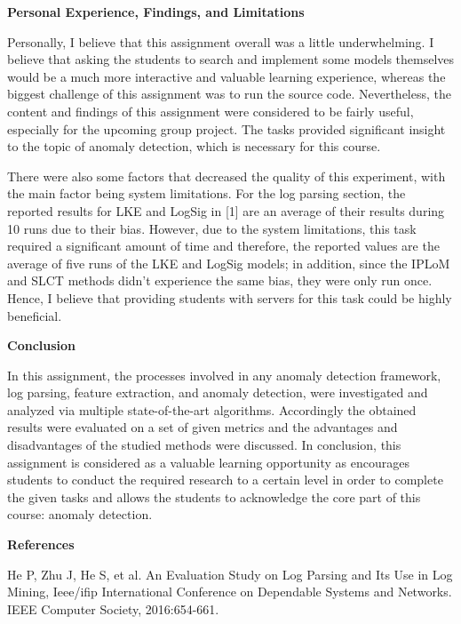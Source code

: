 \documentclass[12pt,a4paper]{article}
\begin{document}
	\vspace{0.4cm}
	\noindent \textbf{\Large Personal Experience, Findings, and Limitations}
	\vspace{0.3cm}
	
	\noindent Personally, I believe that this assignment overall was a little underwhelming. I believe that asking the students to search and implement some models themselves would be a much more interactive and valuable learning experience, whereas the biggest challenge of this assignment was to run the source code. Nevertheless, the content and findings of this assignment were considered to be fairly useful, especially for the upcoming group project. The tasks provided significant insight to the topic of anomaly detection, which is necessary for this course. 
	
	\noindent There were also some factors that decreased the quality of this experiment, with the main factor being system limitations. For the log parsing section, the reported results for LKE and LogSig in [1] are an average of their results during 10 runs due to their bias. However, due to the system limitations, this task required a significant amount of time and therefore, the reported values are the average of five runs of the LKE and LogSig models; in addition, since the IPLoM and SLCT methods didn't experience the same bias, they were only run once. Hence, I believe that providing students with servers for this task could be highly beneficial.
	
	\vspace{0.4cm}
	\noindent \textbf{\Large Conclusion}
	\vspace{0.3cm}
	
	\noindent In this assignment, the processes involved in any anomaly detection framework, log parsing, feature extraction, and anomaly detection, were investigated and analyzed via multiple state-of-the-art algorithms. Accordingly the obtained results were evaluated on a set of given metrics and the advantages and disadvantages of the studied methods were discussed. In conclusion, this assignment is considered as a valuable learning opportunity as encourages students to conduct the required research to a certain level in order to complete the given tasks and allows the students to acknowledge the core part of this course: anomaly detection. 
	
	\noindent \textbf{\Large References}
	\vspace{0.5cm}
	
	\noindent[1] He P, Zhu J, He S, et al. An Evaluation Study on Log Parsing and Its Use in Log Mining, Ieee/ifip International Conference on Dependable Systems and Networks. IEEE Computer Society, 2016:654-661.
	
\end{document}
